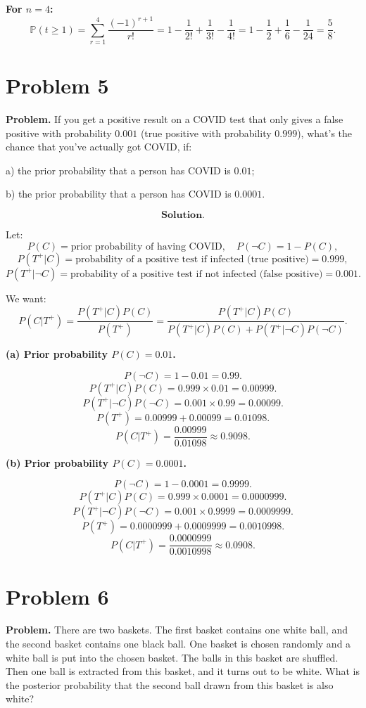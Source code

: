 \documentclass{article}
\begin{document}
\textbf{For $n=4$:}
\[
\mathbb{P}(t\ge 1)=\sum_{r=1}^4 \frac{(-1)^{r+1}}{r!}
=1-\frac{1}{2!}+\frac{1}{3!}-\frac{1}{4!}
=1-\frac12+\frac16-\frac{1}{24}
=\frac{5}{8}.
\]

\section{Problem 5}

\textbf{Problem.} If you get a positive result on a COVID test that only gives a false positive with probability \( 0.001 \) (true positive with probability \( 0.999 \)), what’s the chance that you’ve actually got COVID, if:

a) the prior probability that a person has COVID is \( 0.01 \);

b) the prior probability that a person has COVID is \( 0.0001 \).

\[
\textbf{Solution.}
\]

Let:
\[
P(C) = \text{prior probability of having COVID}, \quad
P(\neg C) = 1 - P(C),
\]
\[
P(T^+|C) = \text{probability of a positive test if infected (true positive)} = 0.999,
\]
\[
P(T^+|\neg C) = \text{probability of a positive test if not infected (false positive)} = 0.001.
\]

We want:
\[
P(C|T^+) = \frac{P(T^+|C)P(C)}{P(T^+)} = \frac{P(T^+|C)P(C)}{P(T^+|C)P(C) + P(T^+|\neg C)P(\neg C)}.
\]

\textbf{(a) Prior probability \( P(C) = 0.01 \).}

\[
P(\neg C) = 1 - 0.01 = 0.99.
\]
\[
P(T^+|C)P(C) = 0.999 \times 0.01 = 0.00999.
\]
\[
P(T^+|\neg C)P(\neg C) = 0.001 \times 0.99 = 0.00099.
\]
\[
P(T^+) = 0.00999 + 0.00099 = 0.01098.
\]
\[
P(C|T^+) = \frac{0.00999}{0.01098} \approx 0.9098.
\]

\textbf{(b) Prior probability \( P(C) = 0.0001 \).}

\[
P(\neg C) = 1 - 0.0001 = 0.9999.
\]
\[
P(T^+|C)P(C) = 0.999 \times 0.0001 = 0.0000999.
\]
\[
P(T^+|\neg C)P(\neg C) = 0.001 \times 0.9999 = 0.0009999.
\]
\[
P(T^+) = 0.0000999 + 0.0009999 = 0.0010998.
\]
\[
P(C|T^+) = \frac{0.0000999}{0.0010998} \approx 0.0908.
\]

\section{Problem 6}

\textbf{Problem.} There are two baskets. The first basket contains one white ball, and the second basket contains one black ball. One basket is chosen randomly and a white ball is put into the chosen basket. The balls in this basket are shuffled. Then one ball is extracted from this basket, and it turns out to be white. What is the posterior probability that the second ball drawn from this basket is also white?
\end{document}
